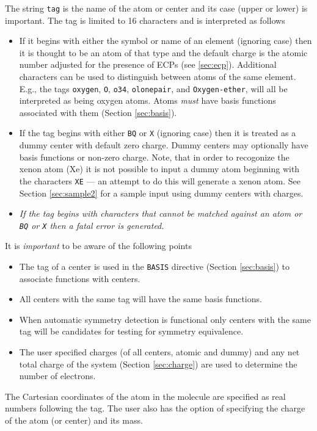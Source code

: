The string \verb+tag+ is the name of the atom or center and its case
(upper or lower) is important.  The tag is limited to 16 characters
and is interpreted as follows
\begin{itemize}
\item If it begins with either the symbol or name of an element
  (ignoring case) then it is thought to be an atom of that type
  and the default charge is the atomic number adjusted for the
  presence of ECPs (see \ref{sec:ecp}).  Additional characters can
  be used to distinguish between atoms of the same element. E.g.,
  the tags \verb+oxygen+, \verb+O+, \verb+o34+, \verb+olonepair+,
  and \verb+Oxygen-ether+, will all be interpreted as being oxygen
  atoms.  Atoms {\em must} have basis functions associated with
  them (Section \ref{sec:basis}). 
\item If the tag begins with either \verb+BQ+ or \verb+X+
  (ignoring case) then it is treated as a dummy center with
  default zero charge. Dummy centers may optionally have basis
  functions or non-zero charge.  Note, that in order to recogonize
  the xenon atom (Xe) it is not possible to input a dummy atom 
  beginning with the characters \verb+XE+ --- an attempt to do
  this will generate a xenon atom.  See Section \ref{sec:sample2} for
  a sample input using dummy centers with charges.
\item {\em If the tag begins with characters that cannot be
    matched against an atom or \verb+BQ+ or \verb+X+ then a fatal
    error is generated.}
\end{itemize}

It is {\em important} to be aware of the following points
\begin{itemize}
\item The tag of a center is used in the \verb+BASIS+ directive (Section
\ref{sec:basis}) to associate functions with centers.  
\item All centers with the same tag will have the same basis
functions.
\item When automatic symmetry detection is functional only centers
with the same tag will be candidates for testing for symmetry
equivalence.
\item The user specified charges (of all centers, atomic and dummy)
and any net total charge of the system (Section \ref{sec:charge}) are
used to determine the number of electrons.
\end{itemize}

The Cartesian coordinates of the atom in the molecule are specified as
real numbers following the tag.  The user also has the option of
specifying the charge of the atom (or center) and its mass.

